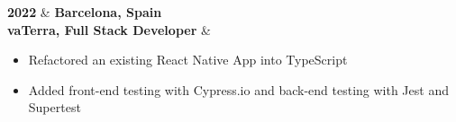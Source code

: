 \textbf{2022} & \textbf{Barcelona, Spain} \\
\textbf{vaTerra, Full Stack Developer} \faExternalLink & 
\begin{itemize}[leftmargin=0.5cm,itemsep=0pt,parsep=0pt]
\item Refactored an existing React Native App into TypeScript
\item Added front-end testing with Cypress.io and back-end testing with Jest and Supertest
\end{itemize} \\ 
